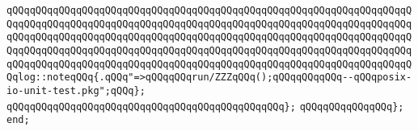\verb|qQQqqQQqqQQqqQQqqQQqqQQqqQQqqQQqqQQqqQQqqQQqqQQqqQQqqQQqqQQqqQQqqQQqqQQqqQQqqQQqqQQqqQQqqQQqqQQqqQQqqQQqqQQqqQQqqQQqqQQqqQQqqQQqqQQqqQQqqQQqqQQqqQQqqQQqqQQqqQQqqQQqqQQqqQQqqQQqqQQqqQQqqQQqqQQqqQQqqQQqqQQqqQQqqQQqqQQqqQQqqQQqqQQqqQQqqQQqqQQqqQQqqQQqqQQqqQQqqQQqqQQqqQQqqQQqqQQqqQQqqQQqqQQqqQQqqQQqqQQqqQQqqQQqqQQqqQQqqQQqqQQqqQQqqQQqqQQqqQQqqQQqqQQqqQQqlog::noteqQQq{.qQQq"=>qQQqqQQqrun/ZZZqQQq();qQQqqQQqqQQq--qQQqposix-io-unit-test.pkg";qQQq};|\newline
\verb|qQQqqQQqqQQqqQQqqQQqqQQqqQQqqQQqqQQqqQQqqQQqqQQq};|\newline
\verb|qQQqqQQqqQQqqQQq};|\newline
\verb|end;|\newline

